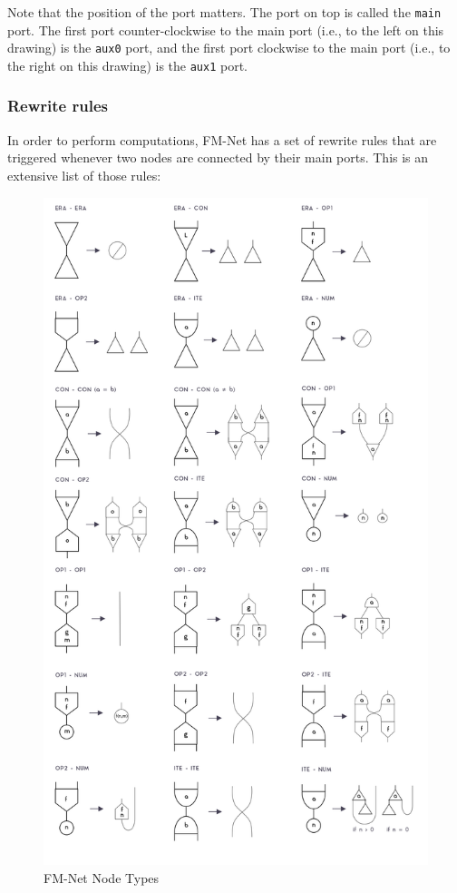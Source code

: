 \documentclass{article}
\theoremstyle{definition}
\theoremstyle{theorem}
\begin{document}
Note that the position of the port matters. The port on top is called the
\verb|main| port. The first port counter-clockwise to the main port (i.e., to
the left on this drawing) is the \verb|aux0| port, and the first port clockwise
to the main port (i.e., to the right on this drawing) is the \verb|aux1| port.

\subsubsection{Rewrite rules}

In order to perform computations, FM-Net has a set of rewrite rules that are
triggered whenever two nodes are connected by their main ports. This is an
extensive list of those rules:

\begin{figure}[H]
  \includegraphics[width=\linewidth]{fm-net-rewrite-rules.png}
  \caption{FM-Net Node Types}
\end{figure}
\end{document}
